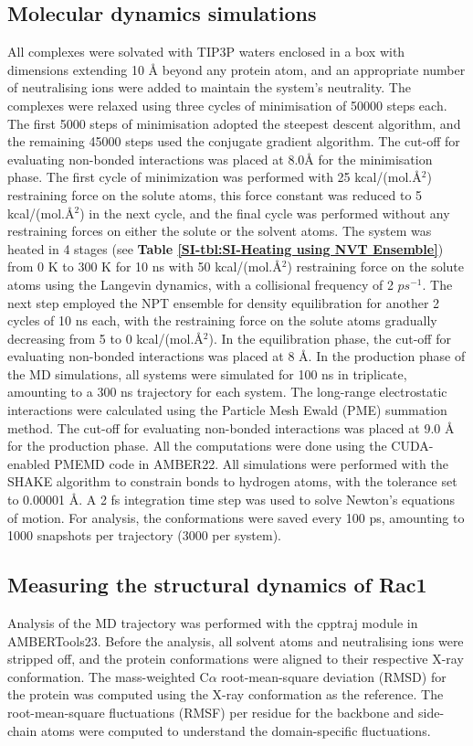 \documentclass[12pt,a4paper]{achemso}
\begin{document}
\subsection{Molecular dynamics simulations} 
 All complexes were solvated with TIP3P\cite{tip3p} waters enclosed in a box with dimensions extending 10 \r{A} beyond any protein atom, and an appropriate number of neutralising ions were added to maintain the system's neutrality. The complexes were relaxed using three cycles of minimisation of 50000 steps each.  The first 5000 steps of minimisation adopted the steepest descent algorithm, and the remaining 45000 steps used the conjugate gradient algorithm. The cut-off for evaluating non-bonded interactions was placed at 8.0\r{A} for the minimisation phase. The first cycle of minimization was performed with  25 kcal/(mol.{\r{A}$^2$}) restraining force on the solute atoms, this force constant was reduced to 5 kcal/(mol.\r{A}$^2$) in the next cycle, and the final cycle was performed without any restraining forces on either the solute or the solvent atoms. The system was heated in 4 stages (see \textbf{Table \ref{SI-tbl:SI-Heating using NVT Ensemble}}) from 0 K to 300 K for 10 ns with  50 kcal/(mol.{\r{A}$^2$}) restraining force on the solute atoms using the Langevin dynamics, with a collisional frequency of  2 $ps^{-1}$.  The next step employed the NPT ensemble for density equilibration for another 2 cycles of 10 ns each, with the restraining force on the solute atoms gradually decreasing from 5 to 0 kcal/(mol.{\r{A}$^2$}). In the equilibration phase, the cut-off for evaluating non-bonded interactions was placed at 8 \r{A}. In the production phase of the MD simulations, all systems were simulated for 100 ns in triplicate, amounting to a 300 ns trajectory for each system.  The long-range electrostatic interactions were calculated using the Particle Mesh Ewald (PME) summation method\cite{pme}. The cut-off for evaluating non-bonded interactions was placed at 9.0 \r{A}  for the production phase. All the computations were done using the CUDA-enabled PMEMD code\cite{pmemd01, pmemd02, pmemd03} in AMBER22\cite{amber22, amber}.  
All simulations were performed with the SHAKE algorithm\cite{shake} to constrain bonds to hydrogen atoms, with the tolerance set to 0.00001 \r{A}.  A 2 fs integration time step was used to solve Newton's equations of motion.  For analysis, the conformations were saved every 100 ps, amounting to 1000 snapshots per trajectory (3000 per system). 


\subsection{Measuring the structural dynamics of Rac1} 
    Analysis of the MD trajectory was performed with the cpptraj\cite{cpptraj} module in AMBERTools23.  Before the analysis, all solvent atoms and neutralising ions were stripped off, and the protein conformations were aligned to their respective X-ray conformation.  The mass-weighted C$\alpha$ root-mean-square deviation (RMSD) for the protein was computed using the X-ray conformation as the reference. The root-mean-square fluctuations (RMSF) per residue for the backbone and side-chain atoms were computed to understand the domain-specific fluctuations.
    
\end{document}
